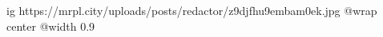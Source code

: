  
 
 
 
 

\ifcmt
  ig https://mrpl.city/uploads/posts/redactor/z9djfhu9embam0ek.jpg
  @wrap center
  @width 0.9
\fi
